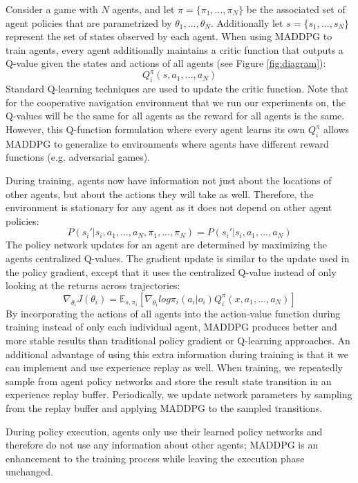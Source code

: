 \documentclass{article}
\begin{document}
Consider a game with $N$ agents, and let $\pi = \{\pi_1, ..., \pi_N\}$ be the associated set of agent policies that are parametrized by $\theta_1, ..., \theta_N$. Additionally let $s = \{s_1, ..., s_N\}$ represent the set of states observed by each agent. When using MADDPG to train agents, every agent additionally maintains a critic function that outputs a Q-value given the states and actions of all agents (see Figure \ref{fig:diagram}):
$$Q^\pi_i(s, a_1, ..., a_N)$$
Standard Q-learning techniques are used to update the critic function. Note that for the cooperative navigation environment that we run our experiments on, the Q-values will be the same for all agents as the reward for all agents is the same. However, this Q-function formulation where every agent learns its own $Q^\pi_i$ allows MADDPG to generalize to environments where agents have different reward functions (e.g. adversarial games).

During training, agents now have information not just about the locations of other agents, but about the actions they will take as well. Therefore, the environment is stationary for any agent as it does not depend on other agent policies:
$$P(s_i'|s_i, a_1, ..., a_N, \pi_1, ..., \pi_N) = P(s_i'|s_i, a_1, ..., a_N)$$
The policy network updates for an agent are determined by maximizing the agents centralized Q-values. The gradient update is similar to the update used in the policy gradient, except that it uses the centralized Q-value instead of only looking at the returns across trajectories:
$$\nabla_{\theta_i}J(\theta_i) = \mathbb{E}_{s, \pi_i}[\nabla_{\theta_i}log \pi_i(a_i|o_i)Q^{\pi}_i(x, a_1, ..., a_N)]$$
By incorporating the actions of all agents into the action-value function during training instead of only each individual agent, MADDPG produces better and more stable results than traditional policy gradient or Q-learning approaches. An additional advantage of using this extra information during training is that it we can implement and use experience replay as well. When training, we repeatedly sample from agent policy networks and store the result state transition in an experience replay buffer. Periodically, we update network parameters by sampling from the replay buffer and applying MADDPG to the sampled transitions.

During policy execution, agents only use their learned policy networks and therefore do not use any information about other agents; MADDPG is an enhancement to the training process while leaving the execution phase unchanged.
\end{document}

